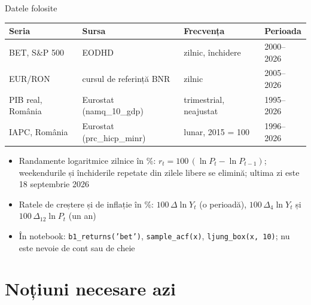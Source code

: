 \begin{frame}{Datele folosite}
\itemsize{\small}
\begin{center}
\footnotesize
\begin{tabular}{llll}
\toprule
\textbf{Seria} & \textbf{Sursa} & \textbf{Frecvența} & \textbf{Perioada} \\
\midrule
BET, S\&P 500 & EODHD & zilnic, închidere & 2000--2026 \\
EUR/RON & cursul de referință BNR & zilnic & 2005--2026 \\
PIB real, România & Eurostat (namq\_10\_gdp) & trimestrial, neajustat & 1995--2026 \\
IAPC, România & Eurostat (prc\_hicp\_minr) & lunar, 2015 = 100 & 1996--2026 \\
\bottomrule
\end{tabular}
\end{center}
\begin{itemize}
    \item Randamente logaritmice zilnice în \%: $r_t = 100\,(\ln P_t - \ln P_{t-1})$; weekendurile și închiderile repetate din zilele libere se elimină; ultima zi este 18 septembrie 2026
    \item Ratele de creștere și de inflație în \%: $100\,\Delta\ln Y_t$ (o perioadă), $100\,\Delta_4\ln Y_t$ și $100\,\Delta_{12}\ln P_t$ (un an)
    \item În notebook: \texttt{b1\_returns('bet')}, \texttt{sample\_acf(x)}, \texttt{ljung\_box(x, 10)}; nu este nevoie de cont sau de cheie
\end{itemize}
\end{frame}


\section{Noțiuni necesare azi}

